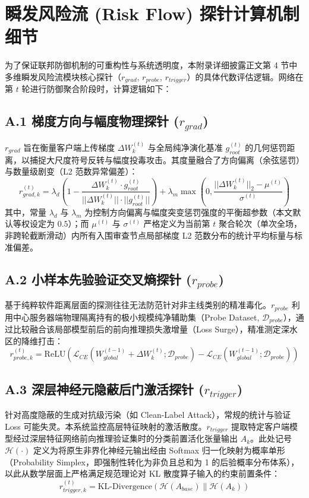 \documentclass[11pt, a4paper, UTF8, fontset=fandol]{ctexart}
\begin{document}
\appendix
\section{瞬发风险流 (Risk Flow) 探针计算机制细节}
为了保证联邦防御机制的可重构性与系统透明度，本附录详细披露正文第 4 节中多维瞬发风险流模块核心探针（$r_{grad}$, $r_{probe}$, $r_{trigger}$）的具体代数评估逻辑。网络在第 $t$ 轮进行防御聚合阶段时，计算逻辑如下：

\subsection{A.1 梯度方向与幅度物理探针 ($r_{grad}$)}
$r_{grad}$ 旨在衡量客户端上传梯度 $\Delta W_k^{(t)}$ 与全局纯净演化基准 $g_{root}^{(t)}$ 的几何惩罚距离，以捕捉大尺度符号反转与幅度投毒攻击。其度量融合了方向偏离（余弦惩罚）与数量级剧变（L2 范数异常偏差）：
\begin{equation}
    r_{grad, k}^{(t)} = \lambda_{d} \left(1 - \frac{\Delta W_k^{(t)} \cdot g_{root}^{(t)}}{||\Delta W_k^{(t)}|| \cdot ||g_{root}^{(t)}||}\right) + \lambda_{m} \max\left(0, \frac{||\Delta W_k^{(t)}||_2 - \mu^{(t)}}{\sigma^{(t)}}\right)
\end{equation}
其中，常量 $\lambda_d$ 与 $\lambda_m$ 为控制方向偏离与幅度突变惩罚强度的平衡超参数（本文默认等权设定为 $0.5$）；而 $\mu^{(t)}$ 与 $\sigma^{(t)}$ 严格定义为当前第 $t$ 聚合轮次（单次全场，非跨轮截断滑动）内所有入围审查节点局部梯度 L2 范数分布的统计平均标量与标准偏差。

\subsection{A.2 小样本先验验证交叉熵探针 ($r_{probe}$)}
基于纯粹软件距离层面的探测往往无法防范针对非主线类别的精准毒化。$r_{probe}$ 利用中心服务器端物理隔离持有的极小规模纯净辅助集（Probe Dataset, $\mathcal{D}_{probe}$），通过比较融合该局部模型前后的前向推理损失激增量（Loss Surge），精准测定深水区的降维打击：
\begin{equation}
    r_{probe, k}^{(t)} = \text{ReLU}\left( \mathcal{L}_{CE}(W_{global}^{(t-1)} + \Delta W_k^{(t)}; \mathcal{D}_{probe}) - \mathcal{L}_{CE}(W_{global}^{(t-1)}; \mathcal{D}_{probe}) \right)
\end{equation}

\subsection{A.3 深层神经元隐蔽后门激活探针 ($r_{trigger}$)}
针对高度隐蔽的生成对抗级污染（如 Clean-Label Attack），常规的统计与验证 Loss 可能失灵。本系统监控高层特征映射的激活散度。$r_{trigger}$ 提取特定客户端模型经过深层特征网络前向推理验证集时的分类前置活化张量输出 $A_k$。此处记号 $\mathcal{H}(\cdot)$ 定义为将原生非界化神经元输出经由 Softmax 归一化映射为概率单形（Probability Simplex，即强制性转化为非负且总和为 1 的后验概率分布体系），以此从数学层面上严格满足规范理论对 KL 散度算子输入的约束前置条件：
\begin{equation}
    r_{trigger, k}^{(t)} = \text{KL-Divergence}\left( \mathcal{H}(A_{base}) \| \mathcal{H}(A_k) \right)
\end{equation}
\end{document}
